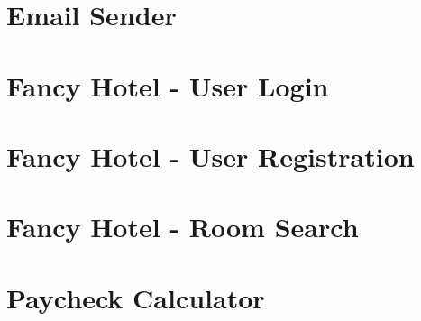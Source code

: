 \begin{appendices}
\lstset{
  numbers=none,
  firstnumber=1,
  numberfirstline=true
}

\section{Email Sender}


\section{Fancy Hotel - User Login}


\section{Fancy Hotel - User Registration}


\section{Fancy Hotel - Room Search}


\section{Paycheck Calculator}


\end{appendices}